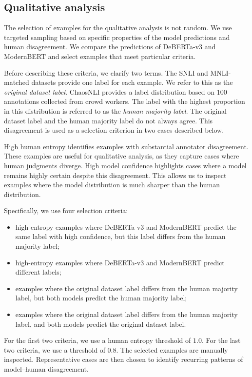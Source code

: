 \documentclass[11pt,a4paper]{article}
\begin{document}
\subsection{Qualitative analysis}

The selection of examples for the qualitative analysis is not random. We use targeted sampling based on specific properties of the model predictions and human disagreement. We compare the predictions of DeBERTa-v3 and ModernBERT and select examples that meet particular criteria.

Before describing these criteria, we clarify two terms. The SNLI and MNLI-matched datasets provide one label for each example. We refer to this as the \textit{original dataset label}. ChaosNLI provides a label distribution based on 100 annotations collected from crowd workers. The label with the highest proportion in this distribution is referred to as the \textit{human majority label}. The original dataset label and the human majority label do not always agree. This disagreement is used as a selection criterion in two cases described below.

High human entropy identifies examples with substantial annotator disagreement. These examples are useful for qualitative analysis, as they capture cases where human judgments diverge. High model confidence highlights cases where a model remains highly certain despite this disagreement. This allows us to inspect examples where the model distribution is much sharper than the human distribution.

Specifically, we use four selection criteria:

\begin{itemize}[itemsep=0.4em, topsep=0.4em]
\item high-entropy examples where DeBERTa-v3 and ModernBERT predict the same label with high confidence, but this label differs from the human majority label;
\item high-entropy examples where DeBERTa-v3 and ModernBERT predict different labels;
\item examples where the original dataset label differs from the human majority label, but both models predict the human majority label;
\item examples where the original dataset label differs from the human majority label, and both models predict the original dataset label.
\end{itemize}

For the first two criteria, we use a human entropy threshold of $1.0$. For the last two criteria, we use a threshold of $0.8$. The selected examples are manually inspected. Representative cases are then chosen to identify recurring patterns of model--human disagreement.
\end{document}
